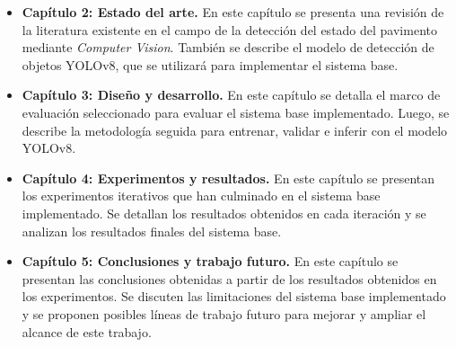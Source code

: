 \begin{itemize}
    \item \textbf{Capítulo 2: Estado del arte.} En este capítulo se presenta una revisión de la literatura existente en el campo de la detección del estado del pavimento mediante \textit{Computer Vision}. También se describe el modelo de detección de objetos YOLOv8, que se utilizará para implementar el sistema base.
    
    \item \textbf{Capítulo 3: Diseño y desarrollo.} En este capítulo se detalla el marco de evaluación seleccionado para evaluar el sistema base implementado. Luego, se describe la metodología seguida para entrenar, validar e inferir con el modelo YOLOv8.
    
    \item \textbf{Capítulo 4: Experimentos y resultados.} En este capítulo se presentan los experimentos iterativos que han culminado en el sistema base implementado. Se detallan los resultados obtenidos en cada iteración y se analizan los resultados finales del sistema base.
    
    \item \textbf{Capítulo 5: Conclusiones y trabajo futuro.} En este capítulo se presentan las conclusiones obtenidas a partir de los resultados obtenidos en los experimentos. Se discuten las limitaciones del sistema base implementado y se proponen posibles líneas de trabajo futuro para mejorar y ampliar el alcance de este trabajo.
\end{itemize}
